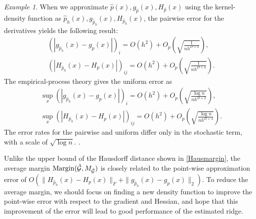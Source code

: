 \documentclass[aos,preprint]{imsart}
\theoremstyle{remark}
\newtheorem*{example}{Example}
\begin{document}
\begin{example}
When we approximate $\hat{p}(x), g_{\hat{p}}(x), H_{\hat{p}}(x)$ using the kernel-density function as $\hat{p}_h(x), g_{\hat{p}_h}(x), H_{\hat{p}_h}(x)$, %
the pairwise error for the derivatives yields the following result:
\[
\begin{aligned}
& ( |g_{\hat{p}_h}(x)-g_p(x)|)_i = O(h^2) + O_p(\sqrt{\frac{1}{{{n h^{D+2}}}}}),\\
& ( |H_{\hat{p}_h}(x)-H_p(x)| )_{ij} = O(h^2) + O_p(\sqrt{\frac{1}{{{n h^{D+4}}}}}).
\end{aligned}
\]
The empirical-process theory gives the uniform error as
\[
\begin{aligned}
& \sup_x( |g_{\hat{p}_h}(x)-g_p(x)|)_i = O(h^2) + O_p(\sqrt{\frac{\log n}{{{n h^{D+2}}}}}),\\
& \sup_x( |H_{\hat{p}_h}(x)-H_p(x)| )_{ij} = O(h^2) + O_p(\sqrt{\frac{\log n}{{{n h^{D+4}}}}}).
\end{aligned}
\]
The error rates for the pairwise and uniform differ only in the stochastic term, with a scale of $\sqrt{\log n}$. \cite{chen2017tutorial,JMLR:v17:ariascastro16a, genovese2014nonparametric}.
\end{example}

Unlike the upper bound of the Hausdorff distance shown in \eqref{Hausmargin}, the average margin ${\rm Margin}(\hat {\mathcal G}, M_{\hat{\cal G}})$ is closely related to the point-wise approximation error of $O (\|H_{\hat{p}_h}(x)-H_p(x)\|_F+\|g_{\hat{p}_h}(x)-g_p(x)\|_2)$. To reduce the average margin, we should focus on finding a new density function to improve the point-wise error with respect to the gradient and Hessian, and hope that this improvement of the error will lead to good performance of the estimated ridge.
\end{document}
